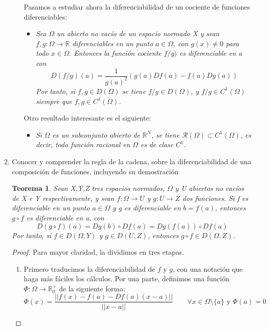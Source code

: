 \documentclass[a4paper, 12pt]{article}
\newtheorem{teorema}{Teorema}
\begin{document}
\begin{enumerate}[label=\textbf{\arabic*}.]
\begin{enumerate}[label=\textit{\alph*})]
		Pasamos a estudiar ahora la diferenciabilidad de un cociente de funciones diferenciables:
		\begin{itemize}
			\item \textit{Sea \(\Omega\) un abierto no vacío de un espacio normado X y sean \(f,g: \Omega \to \mathbb{R}\) diferenciables en un punto \(a \in \Omega\), con \(g(x) \neq 0\) para todo \(x \in \Omega\). Entonces la función cociente \(f/g)\) es diferenciable en a con}
			\[
				D(f/g)(a) = \frac{1}{g(a)^2} (g(a) Df(a) - f(a) Dg(a))
			\]
			\textit{Por tanto, si \(f,g \in D(\Omega)\) se tiene \(f/g \in D(\Omega)\), y \(f/g \in C^1 (\Omega)\) siempre que \(f,g \in C^1(\Omega)\).}
		\end{itemize}
		
		Otro resultado interesante es el siguiente:
		\begin{itemize}
			\item \textit{Si \(\Omega\) es un subconjunto abierto de \(\mathbb{R}^N\), se tiene \(\mathcal{R}(\Omega) \subset C^1(\Omega)\), es decir, toda función racional en \(\Omega\) es de clase \(C^1\).}
		\end{itemize}
	\end{enumerate}

\bigskip

	\item Conocer y comprender la regla de la cadena, sobre la diferenciabilidad de una composición de funciones, incluyendo su demostración
	
	\begin{teorema}
	Sean X,Y,Z tres espacios normados, \(\Omega\) y U abiertos no vacíos de X e Y respectivamente, y sean \(f: \Omega \to U\) y \(g: U \to Z\) dos funciones. Si f es diferenciable en un punto \(a \in \Omega\) y g es diferenciable en \(b = f(a)\), entonces \(g \circ f\) es diferenciable en a, con
	\[
		D(g \circ f)(a) = Dg(b) \circ Df(a) = Dg(f(a)) \circ Df(a)
	\]
	Por tanto, si \(f \in D(\Omega,Y)\) y \(g \in D(U,Z)\), entonces \(g \circ f \in D(\Omega, Z)\).
	\end{teorema}
	
	\begin{proof}
	Para mayor claridad, la dividimos en tres etapas.
	
	\begin{enumerate}[label=\textbf{(\alph*).}]
		\item Primero traducimos la diferenciabilidad de \(f\) y \(g\), con una notación que haga más fáciles los cálculos. Por una parte, definimos una función \(\Phi : \Omega \to \mathbb{R}_0^+\) de la siguiente forma:
		\begin{equation}\label{cadena_1}
			\Phi (x) = \frac{||f(x) - f(a) - Df(a)(x-a)||}{||x-a||} \qquad \forall x \in \Omega \setminus \{a\} \text{ y } \Phi(a) = 0
		\end{equation}
		

\end{enumerate}
\end{proof}
\end{enumerate}
\end{document}
